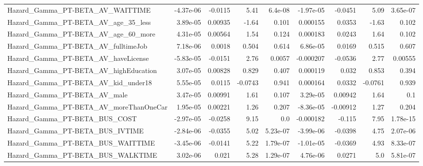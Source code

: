 \begin{tabular}{lrrrrrrrr}
Hazard\_Gamma\_PT-BETA\_AV\_WAITTIME                   &   -4.37e-06 &      -0.0115 &     5.41 &  6.4e-08 &  -1.97e-05 &     -0.0451 &         5.09 &      3.65e-07 \\
Hazard\_Gamma\_PT-BETA\_AV\_age\_35\_less                &    3.89e-05 &      0.00935 &    -1.64 &    0.101 &   0.000155 &      0.0353 &        -1.63 &         0.102 \\
Hazard\_Gamma\_PT-BETA\_AV\_age\_60\_more                &    4.31e-05 &      0.00564 &     1.54 &    0.124 &   0.000183 &      0.0243 &         1.64 &         0.102 \\
Hazard\_Gamma\_PT-BETA\_AV\_fulltimeJob                &    7.18e-06 &       0.0018 &    0.504 &    0.614 &   6.86e-05 &      0.0169 &        0.515 &         0.607 \\
Hazard\_Gamma\_PT-BETA\_AV\_haveLicense                &   -5.83e-05 &      -0.0151 &     2.76 &   0.0057 &  -0.000207 &     -0.0536 &         2.77 &       0.00555 \\
Hazard\_Gamma\_PT-BETA\_AV\_highEducation              &    3.07e-05 &      0.00828 &    0.829 &    0.407 &   0.000119 &       0.032 &        0.853 &         0.394 \\
Hazard\_Gamma\_PT-BETA\_AV\_kid\_under18                &    5.55e-05 &       0.0115 &  -0.0743 &    0.941 &   0.000164 &      0.0332 &      -0.0761 &         0.939 \\
Hazard\_Gamma\_PT-BETA\_AV\_male                       &    3.47e-05 &      0.00991 &     1.61 &    0.107 &   3.29e-05 &     0.00942 &         1.64 &           0.1 \\
Hazard\_Gamma\_PT-BETA\_AV\_moreThanOneCar             &    1.95e-05 &      0.00221 &     1.26 &    0.207 &  -8.36e-05 &    -0.00912 &         1.27 &         0.204 \\
Hazard\_Gamma\_PT-BETA\_BUS\_COST                      &   -2.97e-05 &      -0.0258 &     9.15 &      0.0 &  -0.000182 &      -0.115 &         7.95 &      1.78e-15 \\
Hazard\_Gamma\_PT-BETA\_BUS\_IVTIME                    &   -2.84e-06 &      -0.0355 &     5.02 & 5.23e-07 &  -3.99e-06 &     -0.0398 &         4.75 &      2.07e-06 \\
Hazard\_Gamma\_PT-BETA\_BUS\_WAITTIME                  &   -3.45e-06 &      -0.0141 &     5.22 & 1.79e-07 &  -1.01e-05 &     -0.0369 &         4.93 &      8.33e-07 \\
Hazard\_Gamma\_PT-BETA\_BUS\_WALKTIME                  &    3.02e-06 &        0.021 &     5.28 & 1.29e-07 &   4.76e-06 &      0.0271 &          5.0 &      5.81e-07 \\

\end{tabular}
